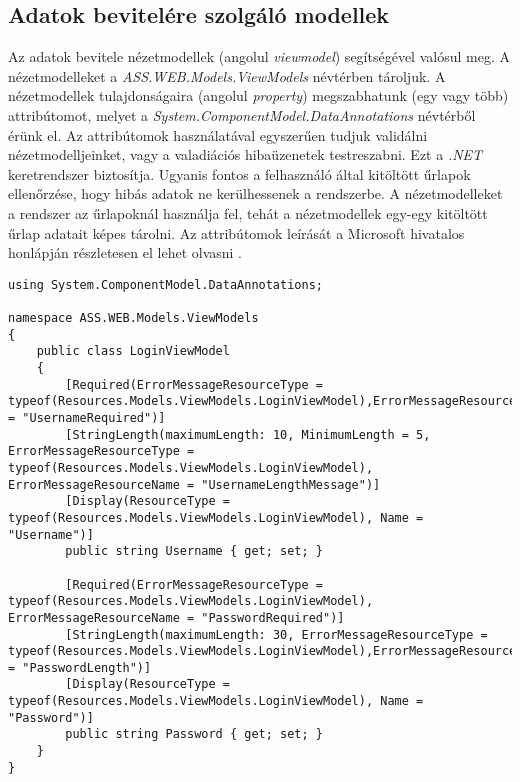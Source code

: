 \subsection{Adatok bevitelére szolgáló modellek}
Az adatok bevitele nézetmodellek (angolul \emph{viewmodel}) segítségével valósul meg. A nézetmodelleket a \emph{ASS.WEB.Models.ViewModels} névtérben tároljuk. A nézetmodellek tulajdonságaira (angolul \emph{property}) megszabhatunk (egy vagy több) attribútomot, melyet a \emph{System.ComponentModel.DataAnnotations} névtérből érünk el. Az attribútomok használatával egyszerűen tudjuk validálni nézetmodelljeinket, vagy a valadiációs hibaüzenetek testreszabni. Ezt a \emph{.NET} keretrendszer biztosítja. Ugyanis fontos a felhasználó által kitöltött űrlapok ellenőrzése, hogy hibás adatok ne kerülhessenek a rendszerbe. A nézetmodelleket a rendszer az űrlapoknál használja fel, tehát a nézetmodellek egy-egy kitöltött űrlap adatait képes tárolni. Az attribútomok leírását a Microsoft hivatalos honlápján részletesen el lehet olvasni \cite{DataAnnotations}.
\begin{lstlisting}[language={[Sharp]C}]
using System.ComponentModel.DataAnnotations;

namespace ASS.WEB.Models.ViewModels
{
	public class LoginViewModel
	{
		[Required(ErrorMessageResourceType = typeof(Resources.Models.ViewModels.LoginViewModel),ErrorMessageResourceName = "UsernameRequired")]
		[StringLength(maximumLength: 10, MinimumLength = 5, ErrorMessageResourceType = typeof(Resources.Models.ViewModels.LoginViewModel), ErrorMessageResourceName = "UsernameLengthMessage")]
		[Display(ResourceType = typeof(Resources.Models.ViewModels.LoginViewModel), Name = "Username")]
		public string Username { get; set; }

		[Required(ErrorMessageResourceType = typeof(Resources.Models.ViewModels.LoginViewModel), ErrorMessageResourceName = "PasswordRequired")]
		[StringLength(maximumLength: 30, ErrorMessageResourceType = typeof(Resources.Models.ViewModels.LoginViewModel),ErrorMessageResourceName = "PasswordLength")]
		[Display(ResourceType = typeof(Resources.Models.ViewModels.LoginViewModel), Name = "Password")]
		public string Password { get; set; }
	}
}
\end{lstlisting}
